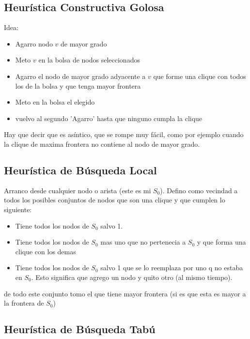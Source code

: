\subsection{Heurística Constructiva Golosa}
Idea:
\begin{itemize}
\item Agarro nodo $v$ de mayor grado
\item Meto $v$ en la bolsa de nodos seleccionados
\item Agarro el nodo de mayor grado adyacente a $v$ que forme una clique con todos los de la bolsa y que tenga mayor frontera
\item Meto en la bolsa el elegido
\item vuelvo al segundo 'Agarro' hasta que ninguno cumpla la clique
\end{itemize}


Hay que decir que es asíntico, que se rompe muy fácil, como por ejemplo cuando la clique de maxima frontera no contiene al nodo de mayor grado.

\subsection{Heurística de Búsqueda Local}

Arranco desde cualquier nodo o arista (este es mi $S_{0}$). Defino como vecindad a todos los posibles conjuntos de nodos que son una clique y que cumplen lo siguiente:
\begin{itemize}
\item Tiene todos los nodos de $S_{0}$ salvo 1.
\item Tiene todos los nodos de $S_{0}$ mas uno que no pertenecia a $S_{0}$ y que forma una clique con los demas 
\item Tiene todos los nodos de $S_{0}$ salvo 1 que se lo reemplaza por uno q no estaba en $S_{0}$. Esto significa que agrego un nodo y quito otro (al mismo tiempo).
\end{itemize}

de todo este conjunto tomo el que tiene mayor frontera (si es que esta es mayor a la frontera de $S_{0}$)



\subsection{Heurística de Búsqueda Tabú}
